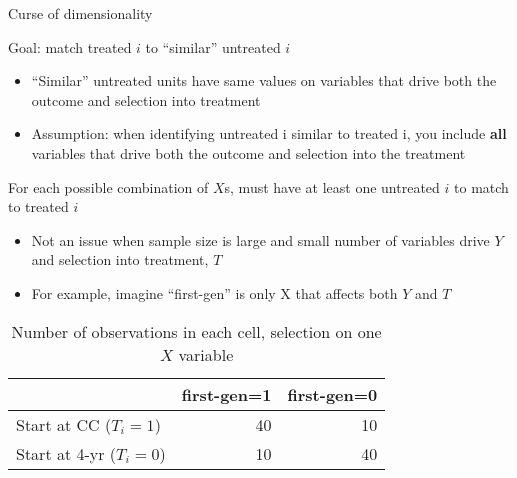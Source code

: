 \begin{frame}[shrink=10]{Curse of dimensionality}

	Goal: match treated $i$ to ``similar'' untreated $i$
	\begin{itemize}
		\item ``Similar'' untreated units have same values on variables that drive both the outcome and selection into treatment
		\item Assumption: when identifying untreated i similar to treated i, you include \textbf{all} variables that drive both the outcome and selection into the treatment
	\end{itemize}
	
	\vspace{2mm}
	For each possible combination of $X$s, must have at least one untreated $i$ to match to treated $i$
	\begin{itemize}
		\item Not an issue when sample size is large and small number of variables drive $Y$ and selection into treatment, $T$
		\item For example, imagine ``first-gen'' is only X that affects both $Y$ and $T$
	\end{itemize}
	
	\vspace{3mm}
	\begin{table}
	\begin{tabular}{l | r | r}
		\hline & first-gen=1 & first-gen=0 \\ \hline
		Start at CC  ($T_i=1$) & 40 & 10 \\ \hline
		Start at 4-yr  ($T_i=0$) & 10 & 40 \\ \hline
	\end{tabular}
	\caption{Number of observations in each cell, selection on one $X$ variable}
	\end{table}

\end{frame}

